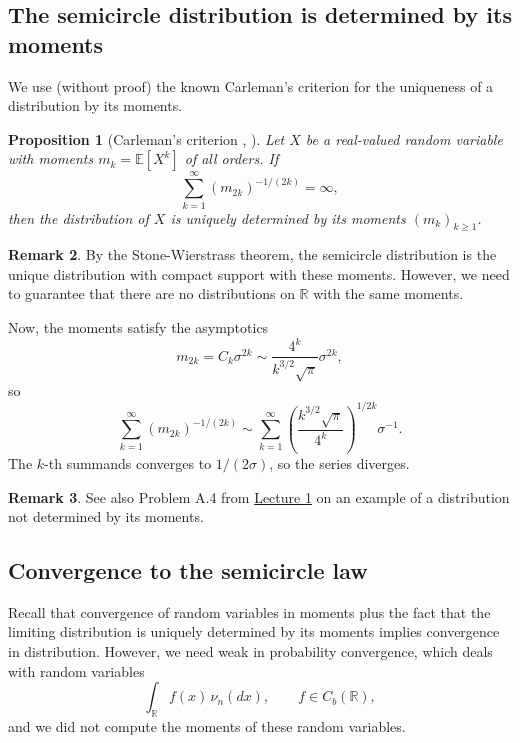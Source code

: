 \documentclass[letterpaper,11pt,oneside,reqno]{article}
\numberwithin{equation}{section}
\newtheorem{proposition}{Proposition}[section]
\theoremstyle{definition}
\newtheorem{remark}[proposition]{Remark}
\begin{document}
\subsection{The semicircle distribution is determined by its moments}
\label{sub:carleman-semicircle}

We use (without proof)
the known Carleman's criterion for the uniqueness of a distribution by its moments.
\begin{proposition}[Carleman's criterion
	{\cite[Theorem~1.10]{shohat1943problem}}, \cite{Akhiezer1965Moment}]
	\label{prop:carleman}
	Let $X$ be a real-valued random variable with moments $m_k
	= \mathbb{E}[X^k]$ of all orders. If \[\sum_{k=1}^{\infty}
	(m_{2k})^{-1/(2k)} = \infty,\] then the distribution of
	$X$ is uniquely determined by its moments $(m_k)_{k\geq 1}$.
\end{proposition}
\begin{remark}
	By the Stone-Wierstrass theorem,
	the semicircle distribution is the unique distribution
	with compact support with these moments.
	However, we need to guarantee that there are no
	distributions on $\mathbb{R}$ with the same moments.
\end{remark}

Now, the moments satisfy the asymptotics
\begin{equation*}
	m_{2k}=C_k \sigma^{2k} \sim
	\frac{4^k}{k^{3/2}\sqrt{\pi}} \sigma^{2k},
\end{equation*}
so
\begin{equation*}
	\sum_{k=1}^{\infty} (m_{2k})^{-1/(2k)} \sim
	\sum_{k=1}^{\infty} \left( \frac{k^{3/2}\sqrt{\pi}}{4^k} \right)^{1/2k} \sigma^{-1}.
\end{equation*}
The $k$-th summands converges to $1/(2\sigma)$, so the
series diverges.

\begin{remark}
	See also Problem A.4 from \href{https://lpetrov.cc/rmt25/rmt25-notes/rmt2025-l01.pdf}{Lecture 1} on an example of a distribution not determined by its moments.
\end{remark}

\subsection{Convergence to the semicircle law}

Recall
\cite[Theorem~30.2]{billingsley1995probability}
that convergence
of random variables
in moments plus the fact that the
limiting distribution is uniquely determined by its moments
implies convergence in distribution.
However, we need weak in probability convergence,
which deals with random variables
\begin{equation*}
\int_{\mathbb{R}} f(x) \, \nu_n(dx),\qquad f\in C_b(\mathbb{R}),
\end{equation*}
and we did not compute the moments of these random variables.
\end{document}
